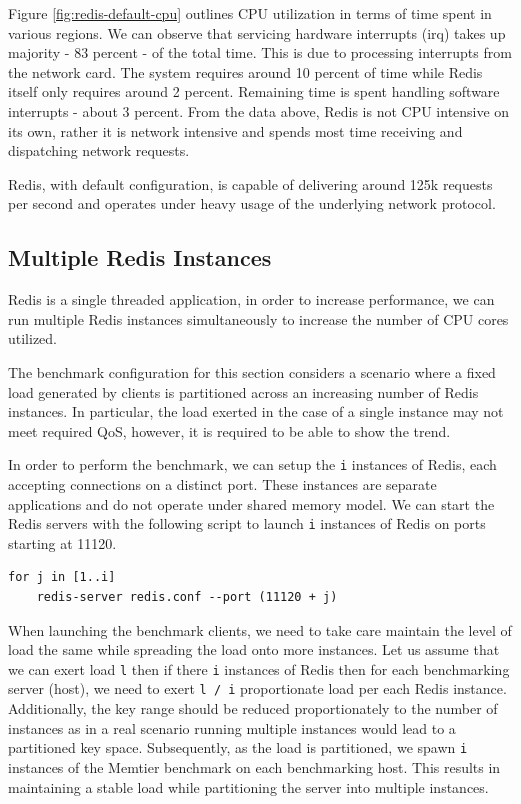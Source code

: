 Figure \ref{fig:redis-default-cpu} outlines CPU utilization in terms of time spent in various regions. We can observe that servicing hardware interrupts (irq) takes up majority - 83 percent - of the total time. This is due to processing interrupts from the network card. The system requires around 10 percent of time while Redis itself only requires around 2 percent. Remaining time is spent handling software interrupts - about 3 percent. From the data above, Redis is not CPU intensive on its own, rather it is network intensive and spends most time receiving and dispatching network requests.


Redis, with default configuration, is capable of delivering around 125k requests per second and operates under heavy usage of the underlying network protocol.


\subsection{Multiple Redis Instances}
\label{sec:multiple-redis-instances}
Redis is a single threaded application, in order to increase performance, we can run multiple Redis instances simultaneously to increase the number of CPU cores utilized.

The benchmark configuration for this section considers a scenario where a fixed load generated by clients is partitioned across an increasing number of Redis instances. In particular, the load exerted in the case of a single instance may not meet required QoS, however, it is required to be able to show the trend.

In order to perform the benchmark, we can setup the \texttt{i} instances of Redis, each accepting connections on a distinct port. These instances are separate applications and do not operate under shared memory model. We can start the Redis servers with the following script to launch \texttt{i} instances of Redis on ports starting at 11120.

\begin{lstlisting}
for j in [1..i]
    redis-server redis.conf --port (11120 + j)
\end{lstlisting}

When launching the benchmark clients, we need to take care maintain the level of load the same while spreading the load onto more instances. Let us assume that we can exert load \texttt{l} then if there \texttt{i} instances of Redis then for each benchmarking server (host), we need to exert \texttt{l / i} proportionate load per each Redis instance. Additionally, the key range should be reduced proportionately to the number of instances as in a real scenario running multiple instances would lead to a partitioned key space. Subsequently, as the load is partitioned, we spawn \texttt{i} instances of the Memtier benchmark on each benchmarking host. This results in maintaining a stable load while partitioning the server into multiple instances.

